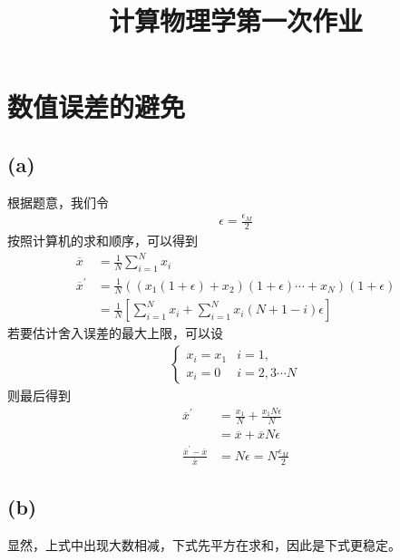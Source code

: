\documentclass{article}
\title{计算物理学第一次作业}
\numberwithin{equation}{section}
\begin{document}
\maketitle
\section{数值误差的避免}
\subsection*{(a)}
根据题意，我们令
\begin{align}
    \epsilon=\frac{\epsilon_M}{2}
\end{align}
按照计算机的求和顺序，可以得到
\begin{align}
    \overline{x}          & =  \frac{1}{N} \sum_{i=1}^N x_i                                                                                                 \\
    \overline{x}^{\prime} & =  \frac{1}{N} \left(\left(x_1\left(1+\epsilon\right)+x_2\right)\left(1+\epsilon\right)\cdots+x_N\right)\left(1+\epsilon\right) \\
                          & =  \frac{1}{N} \left[\sum_{i=1}^N x_i+\sum_{i=1}^N x_i\left(N+1-i\right)\epsilon\right]
\end{align}
若要估计舍入误差的最大上限，可以设
\begin{align}
    \begin{cases}
        x_i=x_1 & i=1,          \\
        x_i=0   & i=2,3\cdots N
    \end{cases}
\end{align}
则最后得到
\begin{align}
    \overline{x}^{\prime}                                   & =\frac{x_1}{N}+\frac{x_1N\epsilon}{N} \\
                                                            & =\overline{x}+\overline{x}N\epsilon   \\
    \frac{\overline{x}^{\prime}-\overline{x}}{\overline{x}} & = N\epsilon=N\frac{\epsilon_M}{2}
\end{align}
\subsection*{(b)}
显然，上式中出现大数相减，下式先平方在求和，因此是下式更稳定。
\end{document}
